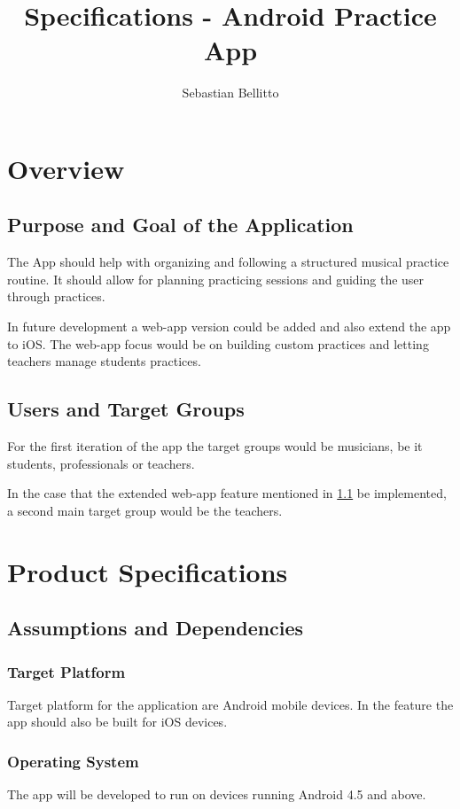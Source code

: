 \documentclass[12pt,a4paper]{report}
\title{Specifications - Android Practice App}
\author{Sebastian Bellitto}
\begin{document}
\maketitle

\setlength{\parindent}{0pt}
\setlength{\parskip}{1.2ex plus 0.5ex minus 0.2ex}

\tableofcontents
\newpage

\chapter{Overview}\label{c1}
\section{Purpose and Goal of the Application}\label{c1-1}
The App should help with organizing and following a structured musical practice routine.
It should allow for planning practicing sessions and guiding the user through practices.

In future development a web-app version could be added and also extend the app to iOS.
The web-app focus would be on building custom practices and letting teachers manage students practices.

\section{Users and Target Groups}\label{c1-2}
For the first iteration of the app the target groups would be musicians, be it students, professionals or teachers.

In the case that the extended web-app feature mentioned in \ref{c1-1} be implemented, a second main target group would be the teachers.

\chapter{Product Specifications}\label{c2}
\section{Assumptions and Dependencies}\label{c2-1}
\subsection{Target Platform}\label{c2-1-1}
Target platform for the application are Android mobile devices.
In the feature the app should also be built for iOS devices.

\subsection{Operating System}\label{c2-1-2}
The app will be developed to run on devices running Android 4.5 and above.
\end{document}

